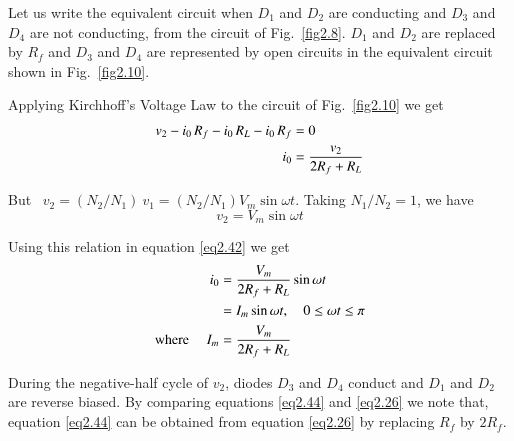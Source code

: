 \begin{solution}
Let us write the equivalent circuit when $D_1$ and $D_2$ are
conducting and $D_3$ and $D_4$ are not conducting, from the circuit of
Fig.~\ref{fig2.8}. $D_1$ and $D_2$ are replaced by $R_f$ and $D_3$ and $D_4$
are represented by open circuits in the equivalent circuit shown in
Fig.~\ref{fig2.10}.

Applying Kirchhoff's Voltage Law to the circuit of Fig.~\ref{fig2.10} we get
\begin{align}
v_2 - i_0\, R_f - i_0\, R_L - i_0\, R_f & =0 \notag\\
i_0 & = \frac{v_2}{2 R_f + R_L} \label{eq2.42}
\end{align}

But \  $v_2 = (N_2/N_1) \ v_1 = (N_2/N_1) V_m \sin \omega t$. Taking $N_1 /
N_2 =1$, we have
$$
v_2 = V_m \sin \omega t
$$

Using this relation in equation \eqref{eq2.42} we get
\begin{align}
i_0 & = \frac{V_m}{2 R_f + R_L} \sin \omega t  \notag\\
& = I_m \sin \omega t, \quad 0 \leq \omega t \leq \pi \label{eq2.43}\\
\text{where } \quad I_m & = \frac{V_m}{2 R_f + R_L} \label{eq2.44}
\end{align}

During the negative-half cycle of $v_2$, diodes $D_3$ and $D_4$
conduct and $D_1$ and $D_2$ are reverse biased. By comparing equations
\eqref{eq2.44} and \eqref{eq2.26} we note that, equation
\eqref{eq2.44} can be obtained from equation \eqref{eq2.26} by
replacing $R_f$ by $2 R_f$.



\end{solution}
